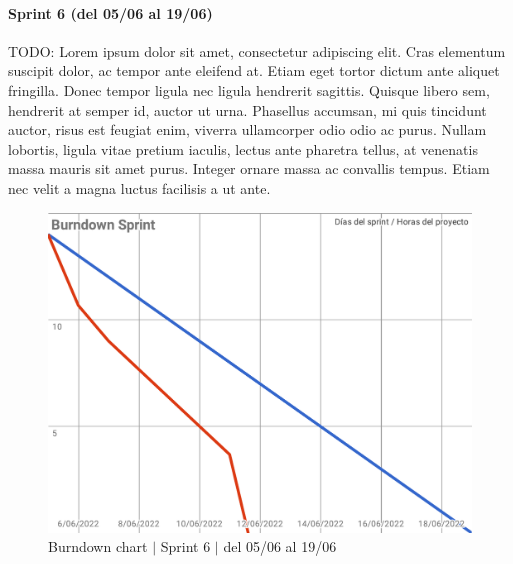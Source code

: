 \paragraph{Sprint 6 (del 05/06 al 19/06)}
TODO: Lorem ipsum dolor sit amet, consectetur adipiscing elit. Cras elementum suscipit dolor, ac tempor ante eleifend at. Etiam eget tortor dictum ante aliquet fringilla. Donec tempor ligula nec ligula hendrerit sagittis. Quisque libero sem, hendrerit at semper id, auctor ut urna. Phasellus accumsan, mi quis tincidunt auctor, risus est feugiat enim, viverra ullamcorper odio odio ac purus. Nullam lobortis, ligula vitae pretium iaculis, lectus ante pharetra tellus, at venenatis massa mauris sit amet purus. Integer ornare massa ac convallis tempus. Etiam nec velit a magna luctus facilisis a ut ante.
\begin{figure}[H]
    \centering
    \includegraphics[width=1\linewidth]{text/image/BurndownChart6.pdf}
    \caption{Burndown chart $|$ Sprint 6 $|$ del 05/06 al 19/06}
    \label{fig:burndown_chart_6}
\end{figure}

\newpage
